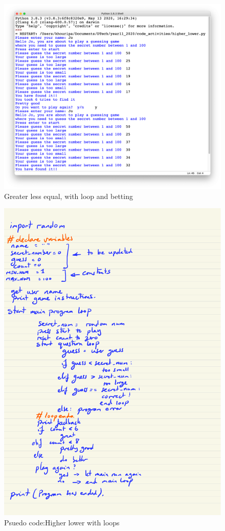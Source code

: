 \documentclass[a4paper,12pt]{article}
\begin{document}
\begin{figure} [!h]
	\centering
	\includegraphics[width=15cm]{screen_shots/higher_lower_play.png}
	\caption*{Greater less equal, with loop and betting}
\end{figure}
\newpage
\begin{figure} [!h]
	\centering
	\includegraphics[width=17cm]{iterative_processes/higher_lower_loop_plan.pdf}
	\caption*{Psuedo code:Higher lower with loops}
\end{figure}

\end{document}
